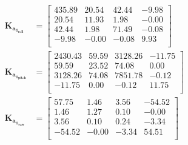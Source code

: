 \begin{equation}
	\begin{split}
		\boldsymbol{K_{a_{1_{roll}}}} &= \begin{bmatrix}
			435.89 & 20.54 & 42.44 & -9.98 \\ 
			20.54 & 11.93 & 1.98 & -0.00 \\ 
			42.44 & 1.98 & 71.49 & -0.08 \\ 
			-9.98 & -0.00 & -0.08 & 9.93 \\ 
		\end{bmatrix}\\ \boldsymbol{K_{a_{1_{pitch}}}} & = \begin{bmatrix}
			2430.43 & 59.59 & 3128.26 & -11.75 \\ 
			59.59 & 23.52 & 74.08 & 0.00 \\ 
			3128.26 & 74.08 & 7851.78 & -0.12 \\ 
			-11.75 & 0.00 & -0.12 & 11.75 \\ 
		\end{bmatrix}\\
		\boldsymbol{K_{a_{1_{yaw}}}} &= 
		\begin{bmatrix}
			57.75 & 1.46 & 3.56 & -54.52 \\ 
			1.46 & 1.27 & 0.10 & -0.00 \\ 
			3.56 & 0.10 & 0.24 & -3.34 \\ 
			-54.52 & -0.00 & -3.34 & 54.51 \\ 
		\end{bmatrix}\\
	\end{split}
\end{equation}

